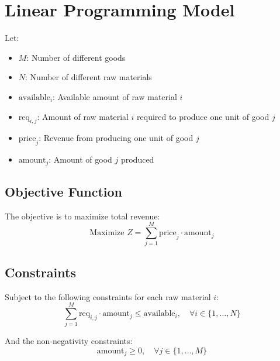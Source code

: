 \documentclass{article}
\begin{document}
\section*{Linear Programming Model}

Let:
\begin{itemize}
    \item \( M \): Number of different goods
    \item \( N \): Number of different raw materials
    \item \( \text{available}_{i} \): Available amount of raw material \( i \)
    \item \( \text{req}_{i,j} \): Amount of raw material \( i \) required to produce one unit of good \( j \)
    \item \( \text{price}_{j} \): Revenue from producing one unit of good \( j \)
    \item \( \text{amount}_{j} \): Amount of good \( j \) produced
\end{itemize}

\subsection*{Objective Function}
The objective is to maximize total revenue:
\[
\text{Maximize } Z = \sum_{j=1}^{M} \text{price}_{j} \cdot \text{amount}_{j}
\]

\subsection*{Constraints}
Subject to the following constraints for each raw material \( i \):
\[
\sum_{j=1}^{M} \text{req}_{i,j} \cdot \text{amount}_{j} \leq \text{available}_{i}, \quad \forall i \in \{1, \ldots, N\}
\]

And the non-negativity constraints:
\[
\text{amount}_{j} \geq 0, \quad \forall j \in \{1, \ldots, M\}
\]
\end{document}
